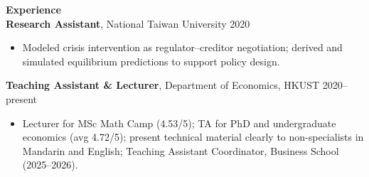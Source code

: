 \documentclass[11pt,letterpaper]{article}
\begin{document}
{\large \textbf{Experience}}\\[-0.5pt]
\textbf{Research Assistant}, National Taiwan University \hfill 2020\\
\vspace{-6pt}
\begin{itemize}
  \item Modeled crisis intervention as regulator--creditor negotiation; derived and simulated equilibrium predictions to support policy design.
\end{itemize}
\textbf{Teaching Assistant \& Lecturer}, Department of Economics, HKUST \hfill 2020--present\\
\vspace{-6pt}
\begin{itemize}
  \item Lecturer for MSc Math Camp (4.53/5); TA for PhD and undergraduate economics (avg 4.72/5); present technical material clearly to non-specialists in Mandarin and English; Teaching Assistant Coordinator, Business School (2025--2026).
\end{itemize}

\vspace{0.15pt}
\end{document}
